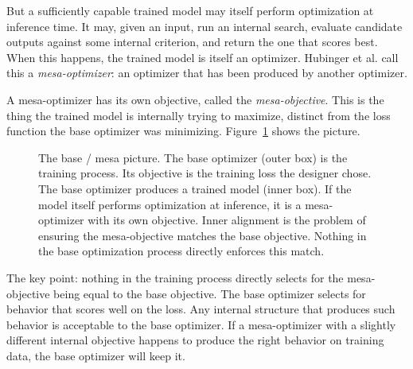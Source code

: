 But a sufficiently capable trained model may itself perform optimization at inference time. It may, given an input, run an internal search, evaluate candidate outputs against some internal criterion, and return the one that scores best. When this happens, the trained model is itself an optimizer. Hubinger et al. call this a \emph{mesa-optimizer}: an optimizer that has been produced by another optimizer.

A mesa-optimizer has its own objective, called the \emph{mesa-objective}. This is the thing the trained model is internally trying to maximize, distinct from the loss function the base optimizer was minimizing. Figure~\ref{fig:base-mesa} shows the picture.

\begin{figure}[h]
\centering
{}
\caption{The base / mesa picture. The base optimizer (outer box) is the training process. Its objective is the training loss the designer chose. The base optimizer produces a trained model (inner box). If the model itself performs optimization at inference, it is a mesa-optimizer with its own objective. Inner alignment is the problem of ensuring the mesa-objective matches the base objective. Nothing in the base optimization process directly enforces this match.}
\label{fig:base-mesa}
\end{figure}

The key point: nothing in the training process directly selects for the mesa-objective being equal to the base objective. The base optimizer selects for behavior that scores well on the loss. Any internal structure that produces such behavior is acceptable to the base optimizer. If a mesa-optimizer with a slightly different internal objective happens to produce the right behavior on training data, the base optimizer will keep it.

